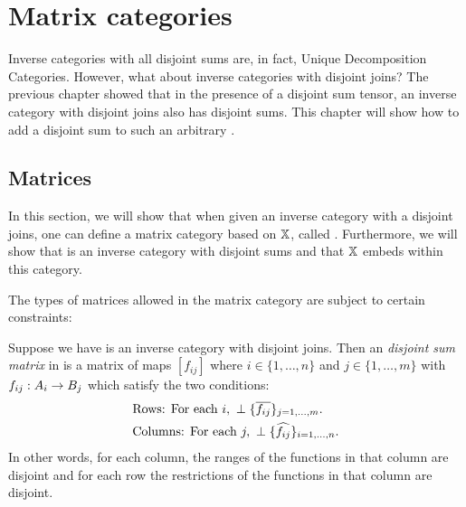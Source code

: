 \chapter{Matrix categories} %
\label{cha:matrix_categories}

Inverse categories with all disjoint sums are, in fact, Unique Decomposition
Categories\cite{haghverdi:2000phd}. However, what about inverse categories with disjoint joins?
The previous chapter showed that in the presence of a disjoint sum tensor, an inverse category \X
with disjoint joins also has disjoint sums. This chapter will show how to add a disjoint sum to
such an arbitrary \X.



\section{Matrices} %
\label{sec:matrix_representation}
In this section, we will show that when given an inverse  category \X with a disjoint joins, one
can define a matrix category based on $\mathbb{X}$, called \imatx. Furthermore, we will show that \imatx is
an inverse category with disjoint sums and that $\mathbb{X}$ embeds within this category.

The types of matrices allowed in the matrix category are subject to certain constraints:
\begin{definition}\label{def:disjoint_sum_matrix}
  Suppose we have \X is an inverse category with disjoint joins. Then an \emph{disjoint sum matrix}
  in \X is a matrix of maps $[f_{i j}]$ where $i \in \{1,\ldots, n\}$ and $j \in \{1,\ldots, m\}$ with
  $f_{ij}:A_i \to B_j$ which satisfy the two conditions:
  \begin{align}
    &\text{Rows: For each }i,\ \perp\{\overline{f_{i j}}\}_{j=1,\ldots,m}.
      \label{eq:disjoint_sum_matrix_row_perp}\\
    &\text{Columns: For each }j,\ \perp\{\widehat{f_{i j}}\}_{i=1,\ldots,n}.
    \label{eq:disjoint_sum_matrix_column_perp}
  \end{align}
  In other words, for each column, the ranges of the functions in that column are disjoint and for
  each row the restrictions of the functions in that column are disjoint.
\end{definition}


